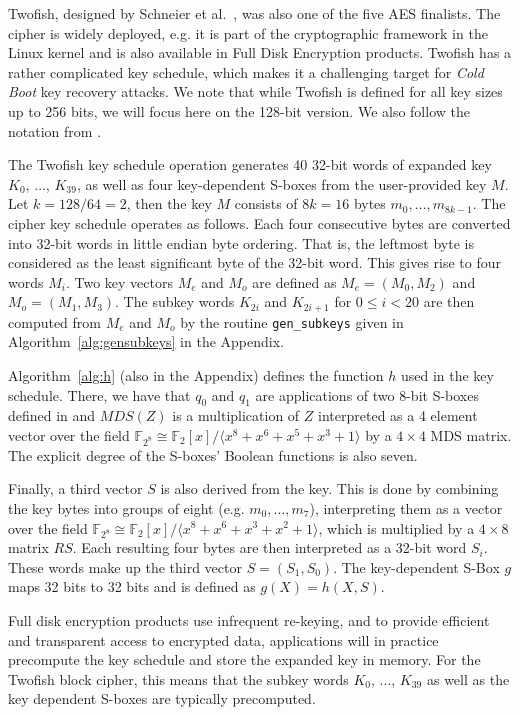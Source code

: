 \documentclass{llncs}
\newcommand{\coldboot}{\emph{Cold Boot}\xspace}
\newcommand{\field}[1]{\mathbb{#1}}
\begin{document}
Twofish, designed by Schneier et al.\ \cite{twofish}, was also one of the five AES finalists. The cipher is widely deployed, e.g. it is part of the cryptographic framework in the Linux kernel and is also available in Full Disk Encryption products. Twofish has a rather complicated key schedule, which makes it a challenging target for \coldboot key recovery attacks. 
We note that while Twofish is defined for all key sizes up to 256 bits, we will focus here on the 128-bit version. We also follow the notation from \cite{twofish}.

The Twofish key schedule operation generates 40 32-bit words of expanded key $K_0$, $\dots$, $K_{39}$, as well as four key-dependent S-boxes from the user-provided key $M$. Let $k=128/64=2$, then the key $M$ consists of $8k = 16$ bytes $m_0, \dots, m_{8k-1}$. The cipher key schedule operates as follows. Each four consecutive bytes are converted into 32-bit words in little endian byte ordering. That is, the leftmost byte is considered as the least significant byte of the 32-bit word. This gives rise to four words $M_i$. Two key vectors $M_e$ and $M_o$ are defined as $M_e = (M_0,M_2)$ and $M_o = (M_1,M_3)$. The subkey words $K_{2i}$ and $K_{2i+1}$ for $0 \leq i < 20$ are then computed from $M_e$ and $M_o$ by the routine \verb|gen_subkeys| given in Algorithm~\ref{alg:gensubkeys} in the Appendix.


Algorithm~\ref{alg:h} (also in the Appendix) defines the function $h$ used in the key schedule. There, we have that $q_0$ and $q_1$ are applications of two 8-bit S-boxes defined in \cite{twofish} and $MDS(Z)$ is a multiplication of $Z$ interpreted as a 4 element vector over the field $\field{F}_{2^8}
\cong \field{F}_2[x]/\langle x^8 + x^6 + x^5 + x^3 + 1 \rangle$ by a $4 \times 4$ MDS matrix. The explicit degree of the S-boxes' Boolean functions is also seven.

Finally, a third vector $S$ is also derived from the key. This is done by combining the key bytes into groups of eight (e.g. $m_0,\dots,m_7$), interpreting them as a vector over the field $\field{F}_{2^8} \cong \field{F}_2[x]/\langle x^8 + x^6 + x^3 + x^2 + 1\rangle$, which is multiplied by a $4 \times 8$ matrix $RS$.
Each resulting four bytes are then interpreted as a 32-bit word $S_i$. These words make up the third vector $S = (S_1,S_0)$. The key-dependent S-Box $g$ maps
32 bits to 32 bits and is defined as $g(X) = h(X,S)$.

Full disk encryption products use infrequent re-keying, and to provide efficient and transparent access to encrypted data, applications will in practice precompute the key schedule and store the expanded key in memory. For the Twofish block cipher, this means that the subkey words $K_0$, $\dots$, $K_{39}$ as well as the key dependent S-boxes are typically precomputed. 
\end{document}
